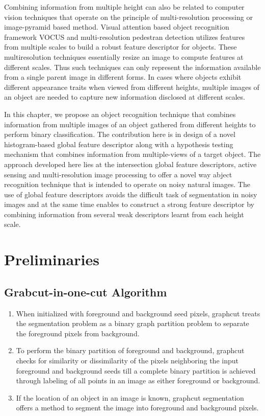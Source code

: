\documentclass {udthesis}
\begin{document}
Combining information from multiple height can also be related to computer vision techniques that operate on the principle of multi-resolution processing or image-pyramid based method. Visual attention based object recognition framework VOCUS \cite{frintrop} and multi-resolution pedestran detection \cite{park} utilizes features from multiple scales to build a robust feature descriptor for objects. These multiresolution techniques essentially resize an image to compute features at different scales. Thus such techniques can only represent the information available from a single parent image in different forms. In cases where objects exhibit different appearance traits when viewed from different heights, multiple images of an object are needed to capture new information disclosed at different scales.

In this chapter, we propose an object recognition technique that combines information from multiple images of an object gathered from different heights to perform binary classification. The contribution here is in design of a novel histogram-based global feature descriptor along with a hypothesis testing mechanism that combines information from multiple-views of a target object. The approach developed here lies at the intersection global feature descriptors, active sensing and multi-resolution image processing to offer a novel way abject recognition technique that is intended to operate on noisy natural images. The use of global feature descriptors avoids the difficult task of segmentation in noisy images and at the same time enables to construct a strong feature descriptor by combining information from several weak descriptors learnt from each height scale.

\section{Preliminaries}

\subsection{Grabcut-in-one-cut Algorithm}
\label{sec:onecut}

\begin{enumerate}
	\item When initialized with foreground and background seed pixels, graphcut treats the segmentation problem as a binary graph partition problem to separate the foreground pixels from background.
	
	\item To perform the binary partition of foreground and background, graphcut checks for similarity or dissimilarity of the pixels neighboring the input foreground and background seeds till a complete binary partition is achieved through labeling of all points in an image as either foreground or background.
	
	\item If the location of an object in an image is known, graphcut segmentation offers a method to segment the image into foreground and background pixels.
\end{enumerate}
\end{document}
